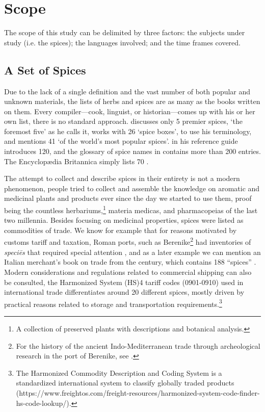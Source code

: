 


\section{Scope}

The scope of this study can be delimited by three factors: the subjects under study (i.e. the spices); the languages involved; and the time frames covered.

\subsection{A Set of Spices}

Due to the lack of a single definition and the vast number of both popular and unknown materials, the lists of herbs and spices are as many as the books written on them. Every compiler---cook, linguist, or historian---comes up with his or her own list, there is no standard approach. \textcite{czarra_spices_2009} discusses only 5 premier spices, `the foremost five' as he calls it, \textcite{nabhan_cumin_2014} works with 26 `spice boxes', to use his terminology, and \textcite{rosengarten_book_1973} mentions 41 `of the world's most popular spices'. \textcite{van_wyk_culinary_2014} in his reference guide introduces 120, and the glossary of spice names in \textcite{dalby_dangerous_2000} contains more than 200 entries. The Encyclopædia Britannica simply lists 70 \autocite{petruzzello_list_nodate}. 

The attempt to collect and describe spices in their entirety is not a modern phenomenon, people tried to collect and assemble the knowledge on aromatic and medicinal plants and products ever since the day we started to use them, proof being the countless herbariums,\footnote{A collection of preserved plants with descriptions and botanical analysis.} \glspl{materia medica}, and \glspl{pharmacopeia} of the last two millennia. Besides focusing on medicinal properties, spices were listed as commodities of trade. We know for example that for reasons motivated by customs tariff and taxation, Roman ports, such as Berenike\footnote{For the history of the ancient Indo-Mediterranean trade through archeological research in the port of Berenike, see \textcite{sidebotham_berenike_2011}.} had inventories of \textit{speciēs} that required special attention \autocite{parthasarathi_roman_2015}, and as a later example we can mention an Italian merchant's book on trade from the  century, which contains 188 ``spices'' \autocite[411-435]{pegolotti_pratica_1936}. Modern considerations and regulations related to commercial shipping can also be consulted, the Harmonized System (HS)4 tariff codes (0901-0910) used in international trade differentiates around 20 different spices, mostly driven by practical reasons related to storage and transportation requirements.\footnote{The Harmonized Commodity Description and Coding System is a standardized international system to classify globally traded products (https://www.freightos.com/freight-resources/harmonized-system-code-finder-hs-code-lookup/).}


